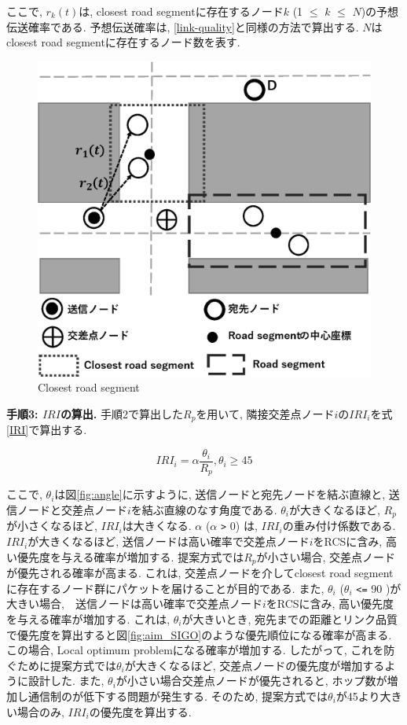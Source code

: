 \documentclass[10pt]{jreport}
\begin{document}
ここで, $r_k(t)$は, closest road segmentに存在するノード$k$ (1 $\leq$  $k$ $\leq$ $N$)の予想伝送確率である. 予想伝送確率は, \ref{link-quality}と同様の方法で算出する. $N$はclosest road segmentに存在するノード数を表す. 

\begin{figure}[!ht]
	\centering
	\includegraphics[width=120mm]{figures/closest_road_segment.eps}
	\caption{Closest road segment}
	\label{fig:closest_road_segment}
\end{figure}

\textbf{手順3: $IRI$の算出.} 手順2で算出した$R_p$を用いて, 隣接交差点ノード$i$の$IRI_i$を式\ref{IRI}で算出する.

\begin{equation}
	\label{IRI}
	IRI_i =  \alpha\frac{\theta_i}{R_p}, \theta_i \geq 45
\end{equation}

ここで, $\theta_i$は図\ref{fig:angle}に示すように, 送信ノードと宛先ノードを結ぶ直線と, 送信ノードと交差点ノード$i$を結ぶ直線のなす角度である. $\theta_i$が大きくなるほど, $R_p$が小さくなるほど, $IRI_i$は大きくなる. 
$\alpha$ ($\alpha$ \verb|>| 0) は, $IRI_i$の重み付け係数である. $IRI_i$が大きくなるほど, 送信ノードは高い確率で交差点ノード$i$をRCSに含み, 高い優先度を与える確率が増加する. 提案方式では$R_p$が小さい場合, 交差点ノードが優先される確率が高まる. これは, 交差点ノードを介してclosest road segmentに存在するノード群にパケットを届けることが目的である. また, $\theta_i$ ($\theta_i$ \verb|<=| 90 )が大きい場合,　送信ノードは高い確率で交差点ノード$i$をRCSに含み, 高い優先度を与える確率が増加する.
これは, $\theta_i$が大きいとき, 宛先までの距離とリンク品質で優先度を算出すると図\ref{fig:aim_SIGO}のような優先順位になる確率が高まる. この場合, Local optimum problemになる確率が増加する. したがって, これを防ぐために提案方式では$\theta_i$が大きくなるほど, 交差点ノードの優先度が増加するように設計した.
また, $\theta_i$が小さい場合交差点ノードが優先されると, ホップ数が増加し通信制のが低下する問題が発生する. 
そのため, 提案方式では$\theta_i$が45より大きい場合のみ, $IRI_i$の優先度を算出する.
\end{document}
